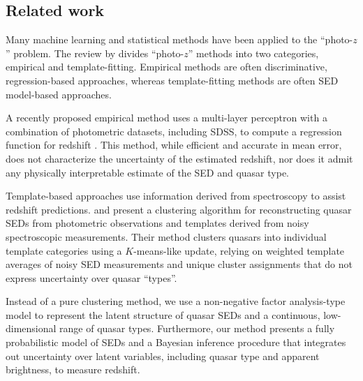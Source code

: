 \documentclass{article} %
\begin{document}
\subsection{Related work}
Many machine learning and statistical methods have been applied to the ``photo-$z$'' problem. The review by \cite{walcher2011fitting} divides ``photo-$z$'' methods into two categories, empirical and template-fitting.  Empirical methods are often discriminative, regression-based approaches, whereas template-fitting methods are often SED model-based approaches.  

A recently proposed empirical method uses a multi-layer perceptron with a combination of photometric datasets, including SDSS, 
to compute a regression function for redshift \cite{brescia2013photometric}. 
This method, while efficient and accurate in mean error, does not characterize the uncertainty of the estimated redshift, nor does it admit any physically interpretable estimate of the SED and quasar type.  

Template-based approaches use information derived from spectroscopy to assist redshift predictions.  
\cite{budavari2001photometric} and \cite{richards2001photometric} present a clustering algorithm for reconstructing quasar SEDs from photometric observations and templates derived from noisy spectroscopic measurements.  
Their method clusters quasars into individual template categories using a $K$-means-like update, relying on weighted template averages of noisy SED measurements and unique cluster assignments that do not express uncertainty over quasar ``types''. 

Instead of a pure clustering method, we use a non-negative factor analysis-type model to represent the latent structure of quasar SEDs and a continuous, low-dimensional range of quasar types.  
Furthermore, our method presents a fully probabilistic model of SEDs and a Bayesian inference procedure that integrates out uncertainty over latent variables, including quasar type and apparent brightness, to measure redshift.    
\end{document}
